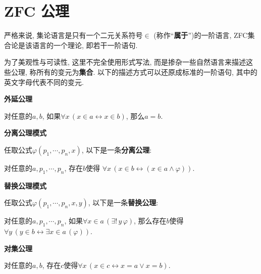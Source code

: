 


\setlength{\abovedisplayskip}{1pt}
\setlength{\belowdisplayskip}{1pt}

\section*{ZFC 公理}

严格来说, 集论语言是只有一个二元关系符号$\in$ (称作``\textbf{属于}'')的一阶语言,
ZFC集合论是该语言的一个理论, 即若干一阶语句.

为了美观性与可读性, 这里不完全使用形式写法, 而是掺杂一些自然语言来描述这些公理,
称所有的变元为\textbf{集合}. 以下的描述方式可以还原成标准的一阶语句,
其中的英文字母代表不同的变元.

\vspace{10pt}


\vspace{10pt}

\hypertarget{sec:外延公理}{}
\noindent\textbf{外延公理}

对任意的$a,b$, 如果$\forall x\,(x\in a\leftrightarrow x\in b)$, 那么$a=b$.

\vspace{10pt}

\hypertarget{sec:分离公理模式}{}
\noindent\textbf{分离公理模式}

任取公式$\varphi(p_1,\cdots,p_n,x)$, 以下是一条\textbf{分离公理}:

对任意的$a,p_1,\cdots,p_n$, 存在$b$使得
$\forall x\,(x\in b\leftrightarrow(x\in a\land\varphi))$.

\vspace{10pt}

\hypertarget{sec:替换公理模式}{}
\noindent\textbf{替换公理模式}

任取公式$\varphi(p_1,\cdots,p_n,x,y)$, 以下是一条\textbf{替换公理}:

对任意的$a,p_1,\cdots,p_n$, 如果$\forall x\in a\,(\exists!\,y\,\varphi)$,
那么存在$b$使得$\forall y\,(y\in b\leftrightarrow\exists x\in a\,(\varphi))$.

\vspace{10pt}

\hypertarget{sec:对集公理}{}
\noindent\textbf{对集公理}

对任意的$a,b$, 存在$c$使得$\forall x\,(x\in c\leftrightarrow x=a\lor x=b)$.

